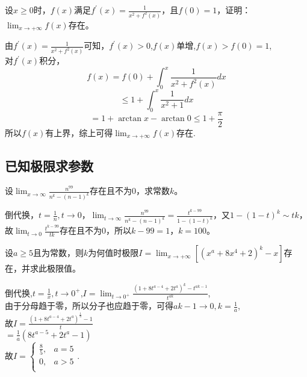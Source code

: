 \begin{example}
	设$x \geq 0$时，$f(x)$满足$f^{'}(x)=\frac{1}{x^2+f^{2}(x)}$，且$f(0)=1$，证明：$\lim_{x \to +\infty}f(x)$存在。
	\begin{solution}
		由$f^{'}(x)=\frac{1}{x^2+f^{2}(x)}$可知，$f^{'}(x)>0$,$f(x)$单增,$f(x)>f(0)=1$,\\
		对$f^{'}(x)$积分，$$f(x)=f(0)+\int_{0}^{x}\frac{1}{x^2+f^{2}(x)}dx$$
		$$\leq 1+\int_{0}^{x}\frac{1}{x^2+1}dx$$
		$$=1+\arctan x-\arctan 0 \leq 1+\frac{\pi}{2}$$
		所以$f(x)$有上界，综上可得$\lim_{x \to +\infty}f(x)$存在.
	\end{solution}
\end{example}

\subsection{已知极限求参数}

\begin{example}
	设$\lim_{x \to \infty}\frac{n^{99}}{n^k-(n-1)^k}$存在且不为$0$，求常数$k$。
	\begin{solution}
		倒代换，$t=\frac{1}{n}, t \to 0$，$\lim_{t \to \infty}\frac{n^{99}}{n^k-(n-1)^k}=\frac{t^{k-99}}{1-(1-t)^k}$，又$1-(1-t)^k\sim tk$，故$\lim_{t \to 0}\frac{t^{k-99}}{tk}$存在且不为0，所以$k-99=1$，$k=100$。
	\end{solution}
\end{example}

\begin{example}
	设$a \geq 5$且为常数，则$k$为何值时极限$I=\lim_{x \to +\infty}[(x^{a}+8x^4+2)^k-x]$存在，并求此极限值。
	\begin{solution}
		倒代换,$t=\frac{1}{x},t \to 0^+$,$I=\lim_{t \to 0^+}\frac{(1+8t^{a-4}+2t^a)^k-t^{ak-1}}{t^{ak}}$,\\
		由于分母趋于零，所以分子也应趋于零，可得$ak-1\to 0,k=\frac{1}{a}$,\\
		故$I=\frac{(1+8t^{a-4}+2t^a)^{\frac{1}{a}}-1}{t}$\\
		$=\frac{1}{a}(8t^{a-5}+2t^a-1)	$\\
		故$I=\begin{cases}
				\frac{8}{5} , & a=5 \\
				0           , & a>5 \\
			\end{cases}$.
	\end{solution}
\end{example}

